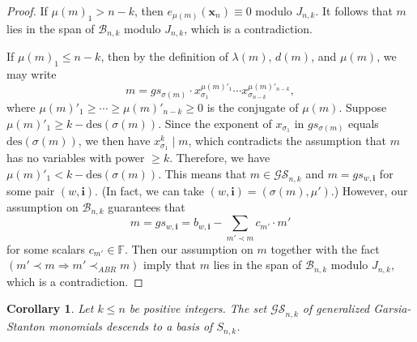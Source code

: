\documentclass[10pt]{amsart}
\newtheorem{corollary}[theorem]{Corollary}
\theoremstyle{definition}
\newcommand{\des}{{\mathrm {des}}}
\newcommand{\symm}{{\mathfrak{S}}}
\newcommand{\FF}{{\mathbb{F}}}
\newcommand{\CCC}{{\mathcal{C}}}
\newcommand{\BBB}{{\mathcal{B}}}
\newcommand{\GS}{{\mathcal{GS}}}
\newcommand{\xx}{{\mathbf {x}}}
\newcommand{\ii}{{\mathbf{i}}}
\newcommand{\edit}[1]{{\color{red}{\bf {#1}}}}
\begin{document}
\begin{proof}
If $\mu(m)_1 > n-k$, then $e_{\mu(m)}(\xx_n) \equiv 0$ modulo $J_{n,k}$.  It follows that $m$ lies in the 
span of $\BBB_{n,k}$ modulo $J_{n,k}$, which is a contradiction.

If $\mu(m)_1 \leq n-k$, then by the definition of $\lambda(m)$, $d(m)$, and $\mu(m)$, we may write
\begin{equation}
m = gs_{\sigma(m)} \cdot x_{\sigma_1}^{\mu(m)'_1} \cdots x_{\sigma_{n-k}}^{\mu(m)'_{n-k}},
\end{equation}
where $\mu(m)'_1 \geq \cdots \geq \mu(m)'_{n-k} \geq 0$ is the conjugate of $\mu(m)$.  
Suppose $\mu(m)'_1 \geq k - \des(\sigma(m))$.  
Since the exponent of $x_{\sigma_1}$ in $gs_{\sigma(m)}$ equals $\des(\sigma(m))$,
we then have $x_{\sigma_1}^k \mid m$, which contradicts the assumption that $m$ has no variables with power
$\geq k$.  
Therefore, we have $\mu(m)'_1 < k - \des(\sigma(m))$.  This means that $m \in \GS_{n,k}$ and $m = gs_{w,\ii}$ for 
some pair $(w,\ii)$.
(In fact, we can take $(w,\ii)=(\sigma(m),\mu')$.)  However, our assumption on $\BBB_{n,k}$ guarantees that 
\begin{equation}
m = gs_{w,\ii} = b_{w,\ii} - \sum_{m' \prec m} c_{m'} \cdot m'
\end{equation}
for some scalars $c_{m'} \in \FF$.  
Then our assumption on $m$ together with the fact $(m' \prec m \Rightarrow m' \prec_{ABR} m)$ imply that 
$m$ lies in the span of $\BBB_{n,k}$ modulo $J_{n,k}$, which is a contradiction.
\end{proof}


\begin{corollary}
\label{garsia-stanton-basis}
Let $k \leq n$ be positive integers.  The set $\GS_{n,k}$ of generalized Garsia-Stanton monomials
descends to a basis of $S_{n,k}$.
\end{corollary}

\end{document}
